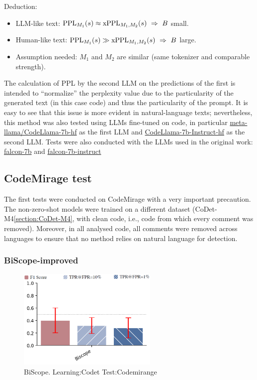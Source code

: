 Deduction:
\begin{itemize}
\item LLM-like text: $\mathrm{PPL}_{M_1}(s)\approx \mathrm{xPPL}_{M_1,M_2}(s)\ \Rightarrow\ B$ small.
\item Human-like text: $\mathrm{PPL}_{M_1}(s)\gg \mathrm{xPPL}_{M_1,M_2}(s)\ \Rightarrow\ B$ large.
\item Assumption needed: $M_1$ and $M_2$ are similar (same tokenizer and comparable strength).
\end{itemize}
The calculation of PPL by the second LLM on the predictions of 
the first is intended to “normalize” the perplexity value due to 
the particularity of the generated text (in this case code) and thus 
the particularity of the prompt. It is easy to see that this issue 
is more evident in natural-language texts; nevertheless, this 
method was also tested using LLMs fine-tuned on code, in particular 
\href{https://huggingface.co/meta-llama/CodeLlama-7b-hf}
{meta-llama/CodeLlama-7b-hf} as the first LLM and 
\href{https://huggingface.co/meta-llama/CodeLlama-7b-Instruct-hf}{CodeLlama-7b-Instruct-hf} 
\cite{roziere2023code} as the second LLM.
Tests were also conducted with the LLMs used in the original work:
\href{https://huggingface.co/tiiuae/falcon-7b}{falcon-7b} and 
\href{https://huggingface.co/tiiuae/falcon-7b-instruct}{falcon-7b-instruct}
\cite{falcon40b}








\subsection{CodeMirage test}
The first tests were conducted on CodeMirage with a very important 
precaution. The non-zero-shot models were trained on a different dataset 
(CoDet-M4\ref{section:CoDet-M4}, with clean code, i.e., code from which every 
comment was removed). Moreover, in all analysed code, all comments were 
removed across languages to ensure that no method relies on natural 
language for detection.

\subsubsection{BiScope-improved}

\begin{figure}[H]
    \centering
    \includegraphics[width=0.6\textwidth]{img/TEST/BiScope/fromCodetCodemirange/test_noramle_migliorato-Recuperato.png}
    \caption{BiScope. Learning:Codet Test:Codemirange}
    \label{fig:BiScope1}
\end{figure}

